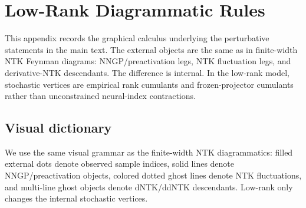\documentclass{article}
\begin{document}
\section{Low-Rank Diagrammatic Rules}
\label{app:diagrammatic-rules}
This appendix records the graphical calculus underlying the perturbative statements in the main text. The external objects are the same as in finite-width NTK Feynman diagrams: NNGP/preactivation legs, NTK fluctuation legs, and derivative-NTK descendants. The difference is internal. In the low-rank model, stochastic vertices are empirical rank cumulants and frozen-projector cumulants rather than unconstrained neural-index contractions.

\subsection{Visual dictionary}
We use the same visual grammar as the finite-width NTK diagrammatics: filled external dots denote observed sample indices, solid lines denote NNGP/preactivation objects, colored dotted ghost lines denote NTK fluctuations, and multi-line ghost objects denote dNTK/ddNTK descendants. Low-rank only changes the internal stochastic vertices.
\end{document}
